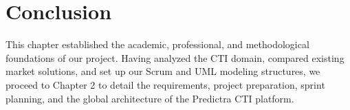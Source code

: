\section{Conclusion}
This chapter established the academic, professional, and methodological foundations of our project. Having analyzed the CTI domain, compared existing market solutions, and set up our Scrum and UML modeling structures, we proceed to Chapter 2 to detail the requirements, project preparation, sprint planning, and the global architecture of the Predictra CTI platform.
